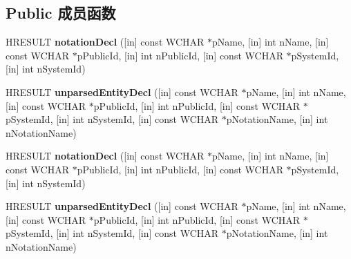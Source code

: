 \subsection*{Public 成员函数}
\begin{DoxyCompactItemize}
\item 
\mbox{\label{interface_m_s_x_m_l2_1_1_i_s_a_x_d_t_d_handler_ae48a68c286c4b0e4908ca675754de28f}} 
H\+R\+E\+S\+U\+LT {\bfseries notation\+Decl} (\mbox{[}in\mbox{]} const W\+C\+H\+AR $\ast$p\+Name, \mbox{[}in\mbox{]} int n\+Name, \mbox{[}in\mbox{]} const W\+C\+H\+AR $\ast$p\+Public\+Id, \mbox{[}in\mbox{]} int n\+Public\+Id, \mbox{[}in\mbox{]} const W\+C\+H\+AR $\ast$p\+System\+Id, \mbox{[}in\mbox{]} int n\+System\+Id)
\item 
\mbox{\label{interface_m_s_x_m_l2_1_1_i_s_a_x_d_t_d_handler_a2b7db6cf82828f2baabdbf85fde935d4}} 
H\+R\+E\+S\+U\+LT {\bfseries unparsed\+Entity\+Decl} (\mbox{[}in\mbox{]} const W\+C\+H\+AR $\ast$p\+Name, \mbox{[}in\mbox{]} int n\+Name, \mbox{[}in\mbox{]} const W\+C\+H\+AR $\ast$p\+Public\+Id, \mbox{[}in\mbox{]} int n\+Public\+Id, \mbox{[}in\mbox{]} const W\+C\+H\+AR $\ast$p\+System\+Id, \mbox{[}in\mbox{]} int n\+System\+Id, \mbox{[}in\mbox{]} const W\+C\+H\+AR $\ast$p\+Notation\+Name, \mbox{[}in\mbox{]} int n\+Notation\+Name)
\item 
\mbox{\label{interface_m_s_x_m_l2_1_1_i_s_a_x_d_t_d_handler_ae48a68c286c4b0e4908ca675754de28f}} 
H\+R\+E\+S\+U\+LT {\bfseries notation\+Decl} (\mbox{[}in\mbox{]} const W\+C\+H\+AR $\ast$p\+Name, \mbox{[}in\mbox{]} int n\+Name, \mbox{[}in\mbox{]} const W\+C\+H\+AR $\ast$p\+Public\+Id, \mbox{[}in\mbox{]} int n\+Public\+Id, \mbox{[}in\mbox{]} const W\+C\+H\+AR $\ast$p\+System\+Id, \mbox{[}in\mbox{]} int n\+System\+Id)
\item 
\mbox{\label{interface_m_s_x_m_l2_1_1_i_s_a_x_d_t_d_handler_a2b7db6cf82828f2baabdbf85fde935d4}} 
H\+R\+E\+S\+U\+LT {\bfseries unparsed\+Entity\+Decl} (\mbox{[}in\mbox{]} const W\+C\+H\+AR $\ast$p\+Name, \mbox{[}in\mbox{]} int n\+Name, \mbox{[}in\mbox{]} const W\+C\+H\+AR $\ast$p\+Public\+Id, \mbox{[}in\mbox{]} int n\+Public\+Id, \mbox{[}in\mbox{]} const W\+C\+H\+AR $\ast$p\+System\+Id, \mbox{[}in\mbox{]} int n\+System\+Id, \mbox{[}in\mbox{]} const W\+C\+H\+AR $\ast$p\+Notation\+Name, \mbox{[}in\mbox{]} int n\+Notation\+Name)

\end{DoxyCompactItemize}

